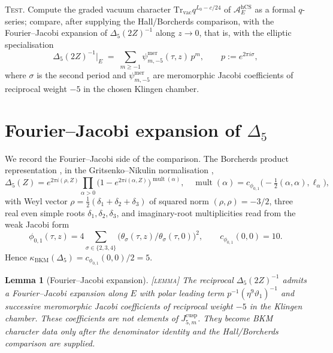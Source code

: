 \documentclass[11pt]{amsart}
\providecommand{\cA}{\mathcal{A}}
\providecommand{\Tr}{\mathrm{Tr}}
\providecommand{\hCS}{\mathrm{hCS}}
\providecommand{\kBKM}{\kappa_{\mathrm{BKM}}}
\providecommand{\mult}{\operatorname{mult}}
\providecommand{\ClaimStatusLemma}{\textsc{[lemma]}}
\theoremstyle{plain}
\newtheorem{lemma}[theorem]{Lemma}
\theoremstyle{definition}
\theoremstyle{remark}
\begin{document}
\textsc{Test.} Compute the graded vacuum character
$\Tr_{\mathrm{vac}}q^{L_{0}-c/24}$ of $\cA_{E}^{\hCS}$ as a formal
$q$-series; compare, after supplying the Hall/Borcherds comparison, with
the Fourier--Jacobi expansion of $\Delta_{5}(2Z)^{-1}$ along
$z\to 0$, that is, with the elliptic
specialisation
\[
\Delta_{5}(2Z)^{-1}\big|_{E}
\;=\;
\sum_{m\geq -1}\psi_{m,-5}^{\mathrm{mer}}(\tau,z)\,p^{m},
\qquad p:=e^{2\pi i\sigma},
\]
where $\sigma$ is the second period and
$\psi_{m,-5}^{\mathrm{mer}}$ are meromorphic Jacobi coefficients of
reciprocal weight $-5$ in the chosen Klingen chamber.

\section{Fourier--Jacobi expansion of $\Delta_{5}$}
\label{sec:fj-expansion-delta5}

We record the Fourier--Jacobi side of the comparison. The Borcherds
product representation \cite{Borcherds1998}, in the Gritsenko--Nikulin
normalisation \cite{GritsenkoNikulin1995},
\begin{equation}
\label{eq:borcherds-product-delta5}
\Delta_{5}(Z)
=
e^{2\pi i(\rho,Z)}\prod_{\alpha>0}
\bigl(1-e^{2\pi i(\alpha,Z)}\bigr)^{\mult(\alpha)},
\quad
\mult(\alpha)
=
c_{\phi_{0,1}}\!\bigl(-\tfrac{1}{2}(\alpha,\alpha),\ell_{\alpha}\bigr),
\end{equation}
with Weyl vector $\rho=\tfrac{1}{2}(\delta_{1}+\delta_{2}+\delta_{3})$
of squared norm $(\rho,\rho)=-3/2$, three real even simple roots
$\delta_{1},\delta_{2},\delta_{3}$, and imaginary-root multiplicities
read from the weak Jacobi form
\[
\phi_{0,1}(\tau,z)
=
4\sum_{\sigma\in\{2,3,4\}}\bigl(\theta_{\sigma}(\tau,z)/\theta_{\sigma}(\tau,0)\bigr)^{2},
\qquad
c_{\phi_{0,1}}(0,0)=10.
\]
Hence $\kBKM(\Delta_{5})=c_{\phi_{0,1}}(0,0)/2=5$.

\begin{lemma}[Fourier--Jacobi expansion]
\label{lem:fj-expansion-delta5-inverse}
\ClaimStatusLemma{}
The reciprocal $\Delta_{5}(2Z)^{-1}$ admits a Fourier--Jacobi expansion
along $E$ with polar leading term
$p^{-1}(\eta^{9}\vartheta_{1})^{-1}$ and successive meromorphic
Jacobi coefficients of reciprocal weight $-5$ in the Klingen chamber.
These coefficients are not elements of $J_{5,m}^{\mathrm{cusp}}$.
They become BKM character data only after the denominator identity and
the Hall/Borcherds comparison are supplied.
\end{lemma}
\end{document}
